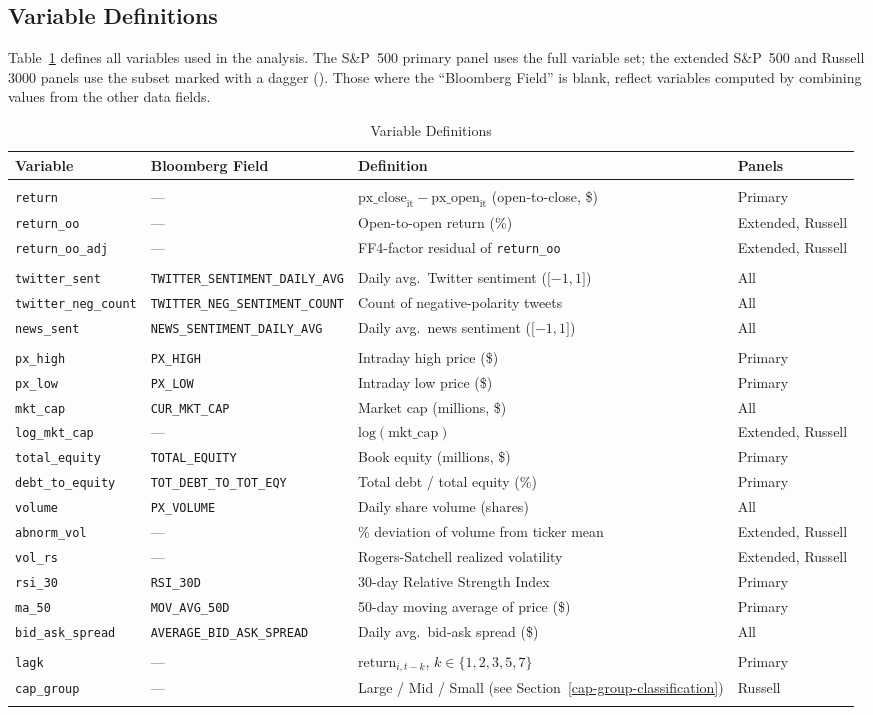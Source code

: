 \subsection{Variable Definitions}\label{variable-definitions}

Table~\ref{tab:variables} defines all variables used in
the analysis. The S\&P~500 primary panel uses the full variable set; the
extended S\&P~500 and Russell 3000 panels use the subset marked with a
dagger (\dag). Those where the ``Bloomberg Field'' is blank, reflect
variables computed by combining values from the other data fields.

\begin{longtable}[]{@{}llll@{}}
\caption{Variable Definitions\label{tab:variables}}\\
\toprule
Variable & Bloomberg Field & Definition & Panels\tabularnewline
\midrule
\endhead
& & &\tabularnewline
\texttt{return} & --- &
\(\text{px\_close}_{\text{it}} - \text{px\_open}_{\text{it}}\)
(open-to-close, \$) & Primary\tabularnewline
\texttt{return\_oo} & --- & Open-to-open return (\%) & Extended,
Russell\tabularnewline
\texttt{return\_oo\_adj} & --- & FF4-factor residual of
\texttt{return\_oo} & Extended, Russell\tabularnewline
& & &\tabularnewline
\texttt{twitter\_sent} & \texttt{TWITTER\_SENTIMENT\_DAILY\_AVG} & Daily
avg.~Twitter sentiment (\(\lbrack - 1,1\rbrack\)) & All\tabularnewline
\texttt{twitter\_neg\_count} & \texttt{TWITTER\_NEG\_SENTIMENT\_COUNT} &
Count of negative-polarity tweets & All\tabularnewline
\texttt{news\_sent} & \texttt{NEWS\_SENTIMENT\_DAILY\_AVG} & Daily
avg.~news sentiment (\(\lbrack - 1,1\rbrack\)) & All\tabularnewline
& & &\tabularnewline
\texttt{px\_high} & \texttt{PX\_HIGH} & Intraday high price (\$) &
Primary\tabularnewline
\texttt{px\_low} & \texttt{PX\_LOW} & Intraday low price (\$) &
Primary\tabularnewline
\texttt{mkt\_cap} & \texttt{CUR\_MKT\_CAP} & Market cap (millions, \$) &
All\tabularnewline
\texttt{log\_mkt\_cap} & --- & \(\text{log}(\text{mkt\_cap})\) &
Extended, Russell\tabularnewline
\texttt{total\_equity} & \texttt{TOTAL\_EQUITY} & Book equity (millions,
\$) & Primary\tabularnewline
\texttt{debt\_to\_equity} & \texttt{TOT\_DEBT\_TO\_TOT\_EQY} & Total
debt / total equity (\%) & Primary\tabularnewline
\texttt{volume} & \texttt{PX\_VOLUME} & Daily share volume (shares) &
All\tabularnewline
\texttt{abnorm\_vol} & --- & \% deviation of volume from ticker mean &
Extended, Russell\tabularnewline
\texttt{vol\_rs} & --- & Rogers-Satchell realized volatility & Extended,
Russell\tabularnewline
\texttt{rsi\_30} & \texttt{RSI\_30D} & 30-day Relative Strength Index &
Primary\tabularnewline
\texttt{ma\_50} & \texttt{MOV\_AVG\_50D} & 50-day moving average of
price (\$) & Primary\tabularnewline
\texttt{bid\_ask\_spread} & \texttt{AVERAGE\_BID\_ASK\_SPREAD} & Daily
avg.~bid-ask spread (\$) & All\tabularnewline
& & &\tabularnewline
\texttt{lagk} & --- & \(\text{return}_{i,t - k}\),
\(k \in \{ 1,2,3,5,7\}\) & Primary\tabularnewline
\texttt{cap\_group} & --- & Large / Mid / Small (see
Section~\ref{cap-group-classification}) &
Russell\tabularnewline
& & &\tabularnewline
\bottomrule
\end{longtable}

